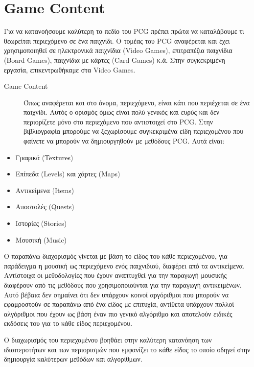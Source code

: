 \section{Game Content}
Για να κατανοήσουμε καλύτερη το πεδίο του PCG πρέπει πρώτα να καταλάβουμε τι θεωρείται περιεχόμενο σε ένα παιχνίδι. Ο τομέας του PCG αναφέρεται και έχει χρησιμοποιηθεί σε ηλεκτρονικά παιχνίδια (Video Games), επιτραπέζια παιχνίδια (Board Games), παιχνίδια με κάρτες (Card Games) κ.ά. Στην συγκεκριμένη εργασία, επικεντρωθήκαμε στα Video Games.

\begin{description}
\item [Game Content] Όπως αναφέρεται και στο όνομα, περιεχόμενο, είναι κάτι που περιέχεται σε ένα παιχνίδι. Αυτός ο ορισμός όμως είναι πολύ γενικός και ευρύς και δεν περιορίζετε μόνο στο περιεχόμενο που αντιστοιχεί στο PCG. Στην βιβλιογραφία μπορούμε να ξεχωρίσουμε συγκεκριμένα είδη περιεχομένου που φαίνετε να μπορούν να δημιουργηθούν με μεθόδους PCG. Αυτά είναι:
\end{description}

\begin{itemize}
  \item Γραφικά (Textures)
  \item Επίπεδα (Levels) και χάρτες (Maps)
   \item Αντικείμενα (Items)
   \item Αποστολές (Quests)
   \item Ιστορίες (Stories)
   \item Μουσική (Music)
\end{itemize}

Ο παραπάνω διαχορισμός γίνεται με βάση το είδος του κάθε περιεχομένου, για παράδειγμα η μουσική ως περιεχόμενο ενός παιχνιδιού, διαφέρει από τα αντικείμενα. Αντίστοιχα οι μεθοδολογίες που έχουν αναπτυχθεί για την παραγωγή μουσικής διαφέρουν από τις μεθόδους που χρησιμοποιούνται για την παραγωγή αντικειμένων. Αυτό βέβαια δεν σημαίνει ότι δεν υπάρχουν κοινοί αργόριθμοι που μπορούν να εφαμροστούν σε παραπάνω από ένα είδος με επιτυχία, αντίθετα υπάρχουν πολλοί αλγόριθμοι που έχουν ως βάση έναν πιο γενικό αλγόριθμο και αποτελούν ειδικές εκδόσεις του για το κάθε είδος περιεχομένου.
\par
Ο διαχωρισμός του περιεχομένου βοηθάει στην καλύτερη κατανόηση των ιδιαιτεροτήτων και των περιορισμών που εμφανίζει το κάθε είδος το οποίο οδηγεί στην δημιουργία καλύτερων μεθόδων και αλγορίθμων.

